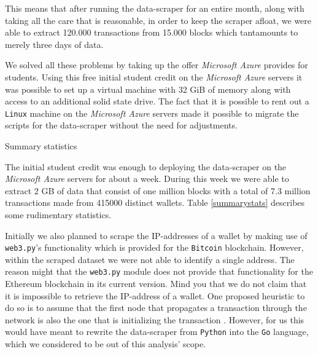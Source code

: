 This means that after running the data-scraper for an entire month, along with taking all the care that is reasonable, in order to keep the scraper afloat, we were able to extract 120.000 transactions from 15.000 blocks which tantamounts to merely three days of data.

We solved all these problems by taking up the offer \emph{Microsoft Azure} provides for students. 
Using this free initial student credit on the \emph{Microsoft Azure} servers it was possible to set up a virtual machine with 32 GiB of memory along with access to an additional solid state drive. 
The fact that it is possible to rent out a \texttt{Linux} machine on the \emph{Microsoft Azure} servers made it possible to migrate the scripts for the data-scraper without the need for adjustments.

\begin{table}[ht]
\centering
\caption{Summary statistics}

\label{summarystats}
\end{table}

The initial student credit was enough to deploying the data-scraper on the \emph{Microsoft Azure} servers for about a week. 
During this week we were able to extract 2 GB of data that consist of one million blocks with a total of 7.3 million transactions made from 415000 distinct wallets. 
Table {\ref{summarystats}} describes some rudimentary statistics.

Initially we also planned to scrape the IP-addresses of a wallet by making use of \texttt{web3.py}'s functionality which is provided for the \texttt{Bitcoin} blockchain. 
However, within the scraped dataset we were not able to identify a single address.
The reason might that the \texttt{web3.py} module does not provide that functionality for the Ethereum blockchain in its current version.
Mind you that we do not claim that it is impossible to retrieve the IP-address of a wallet. 
One proposed heuristic to do so is to assume that the first node that propagates a transaction through the network is also the one that is initializing the transaction \cite{reid2013analysis}. 
However, for us this would have meant to rewrite the data-scraper from \texttt{Python} into the \texttt{Go} language, which we considered to be out of this analysis' scope.